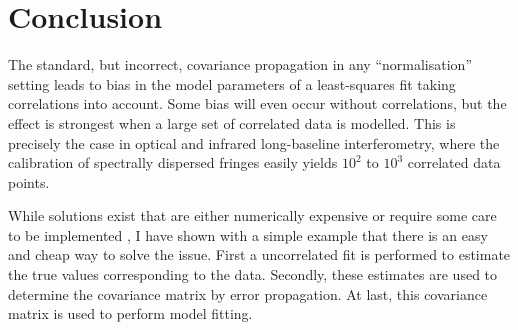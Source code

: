 \documentclass[a4paper,fleqn,usenatbib]{mnras}
\begin{document}
\section{Conclusion}

The standard, but incorrect, covariance propagation in any ``normalisation'' setting leads to bias in the model parameters of a least-squares fit taking correlations into account.  Some bias will even occur without correlations, but the effect is strongest when a large set of correlated data is modelled.  This is precisely the case in optical and infrared long-baseline interferometry, where the calibration of spectrally dispersed fringes easily yields $10^2$ to $10^3$ correlated data points.

While solutions exist that are either numerically expensive or require some care to be implemented \citep{BUR11,BEC12,NIS14}, I have shown with a simple example that there is an easy and cheap way to solve the issue. First a uncorrelated fit is performed to estimate the true values corresponding to the data.  Secondly, these estimates are used to determine the covariance matrix by error propagation. At last, this covariance matrix is used to perform model fitting.





\end{document}
